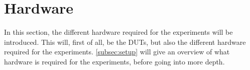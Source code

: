 \section{Hardware}\label{sec:hardware}



In this section, the different hardware required for the experiments will be introduced. This will, first of all, be the DUTs, but also the different hardware required for the experiments. \cref{subsec:setup} will give an overview of what hardware is required for the experiments, before going into more depth.



%

